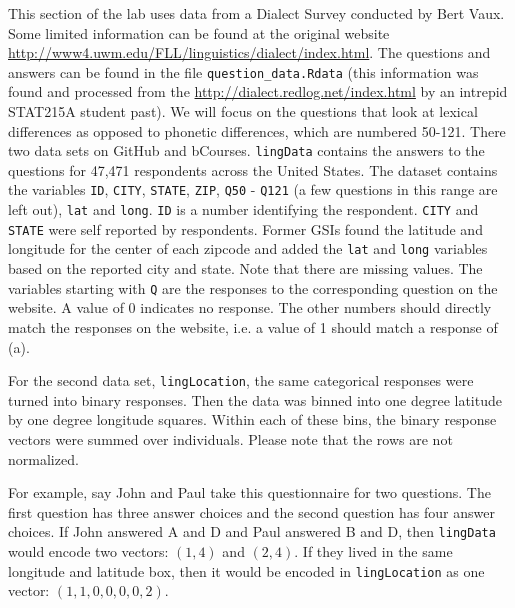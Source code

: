 \documentclass[english]{article}\usepackage[]{graphicx}\usepackage[]{color}
\numberwithin{equation}{section}
\numberwithin{figure}{section}
\begin{document}
This section of the lab uses data from a Dialect Survey conducted by Bert Vaux. Some limited information can be found at the original website \url{http://www4.uwm.edu/FLL/linguistics/dialect/index.html}. The questions and answers can be found in the file \texttt{question\_data.Rdata} (this information was found and processed from the \url{http://dialect.redlog.net/index.html}
by an intrepid STAT215A student past). We will focus on the questions that look at lexical differences as opposed to phonetic differences, which are numbered 50-121. There two data sets on GitHub and bCourses. \texttt{lingData} contains the answers to the questions for 47,471 respondents across the United States. The dataset contains the variables \texttt{ID},
\texttt{CITY}, \texttt{STATE}, \texttt{ZIP}, \texttt{Q50} - \texttt{Q121} (a few questions in this range are left out), \texttt{lat} and \texttt{long}.
\texttt{ID} is a number identifying the respondent. \texttt{CITY} and \texttt{STATE} were self reported by respondents. Former GSIs found the latitude and longitude for the center of each zipcode and
added the \texttt{lat} and \texttt{long} variables based on the reported city and state. Note that there are missing values. The variables starting with \texttt{Q} are the responses to the corresponding question
on the website. A value of 0 indicates no response. The other numbers should directly match the responses on the website, i.e. a value of 1 should match a response of (a).

For the second data set, \texttt{lingLocation}, the same categorical responses were turned into binary responses. Then the data was binned into one degree latitude by one degree longitude squares. Within each of these bins, the binary response vectors were summed over individuals.
Please note that the rows are not normalized.

For example, say John and Paul take this questionnaire for two questions. The first question has three answer choices and the second question has four answer choices. If John answered A and D and Paul answered
B and D, then \texttt{lingData} would encode two vectors: $(1,4)$ and $(2,4)$. If they lived in the same longitude and latitude box, then it would
be encoded in \texttt{lingLocation} as one vector: $(1,1,0,0,0,0,2)$.
\end{document}
